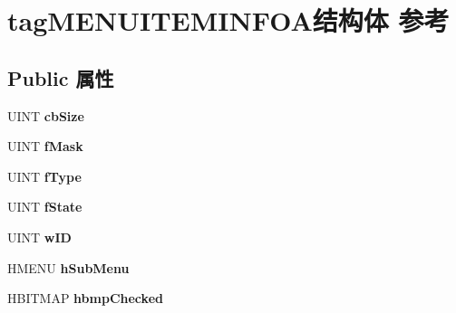 \hypertarget{structtag_m_e_n_u_i_t_e_m_i_n_f_o_a}{}\section{tag\+M\+E\+N\+U\+I\+T\+E\+M\+I\+N\+F\+O\+A结构体 参考}
\label{structtag_m_e_n_u_i_t_e_m_i_n_f_o_a}
\subsection*{Public 属性}
\begin{DoxyCompactItemize}
\item 
\mbox{\label{structtag_m_e_n_u_i_t_e_m_i_n_f_o_a_acda9248a487043c50fb1c099ce08be77}} 
U\+I\+NT {\bfseries cb\+Size}
\item 
\mbox{\label{structtag_m_e_n_u_i_t_e_m_i_n_f_o_a_ac5a669e1a811c4cb0df8ab51d11ecbaf}} 
U\+I\+NT {\bfseries f\+Mask}
\item 
\mbox{\label{structtag_m_e_n_u_i_t_e_m_i_n_f_o_a_a2342d364944212fc046571f16ae4366d}} 
U\+I\+NT {\bfseries f\+Type}
\item 
\mbox{\label{structtag_m_e_n_u_i_t_e_m_i_n_f_o_a_a86cab0dbf60cca1aeb7bbb9d3c0cd120}} 
U\+I\+NT {\bfseries f\+State}
\item 
\mbox{\label{structtag_m_e_n_u_i_t_e_m_i_n_f_o_a_aaa91f55daf36564d3b25c6b31fb9a52f}} 
U\+I\+NT {\bfseries w\+ID}
\item 
\mbox{\label{structtag_m_e_n_u_i_t_e_m_i_n_f_o_a_a4624b6f32076ae39f6b13094774d6a8a}} 
H\+M\+E\+NU {\bfseries h\+Sub\+Menu}
\item 
\mbox{\label{structtag_m_e_n_u_i_t_e_m_i_n_f_o_a_a12c00b28c9d1610189b4531dacc2f348}} 
H\+B\+I\+T\+M\+AP {\bfseries hbmp\+Checked}
\item 
\mbox{\label{structtag_m_e_n_u_i_t_e_m_i_n_f_o_a_a396c596a1fcd3f97b714f0e841b4c218}} 

\end{DoxyCompactItemize}
